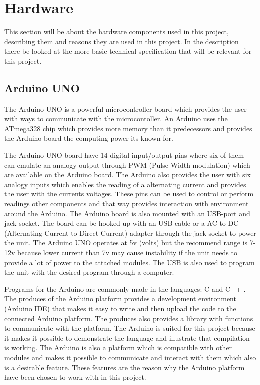 \section{Hardware}
This section will be about the hardware components used in this project, describing them and reasons they are used in this project. In the description there be looked at the more basic technical specification that will be relevant for this project.
\subsection{Arduino UNO}
The Arduino UNO is a powerful microcontroller board which provides the user with ways to communicate with the microcontoller. An Arduino uses the ATmega328 chip which provides more memory than it predecessors and provides the Arduino board the computing power its known for. 

The Arduino UNO board have 14 digital input/output pins where six of them can emulate an analogy output through PWM (Pulse-Width modulation) which are available on the Arduino board. The Arduino also provides the user with six analogy inputs which enables the reading of a alternating current and provides the user with the currents voltages. These pins can be used to control or perform readings other components and that way provides interaction with environment around the Arduino.
The Arduino board is also mounted with an USB-port and jack socket. The board can be hooked up with an USB cable or a AC-to-DC (Alternating Current to Direct Current) adapter through the jack socket to power the unit. The Arduino UNO operates at 5v (volts) but the recommend range is 7-12v because lower current than 7v may cause instability if the unit needs to provide a lot of power to the attached modules. The USB is also used to program the unit with the desired program through a computer. 

Programs for the Arduino are commonly made in the languages: C and C++ . The produces of the Arduino platform provides a development environment (Arduino IDE) that makes it easy to write and then upload the code to the connected Arduino platform. The produces also provides a library with functions to communicate with the platform.
The Arduino is suited for this project because it makes it possible to demonstrate the language and illustrate that compilation is working. The Arduino is also a platform which is compatible with other modules and makes it possible to communicate and interact with them which also is a desirable feature. These features are the reason why the Arduino platform have been chosen to work with in this project.

